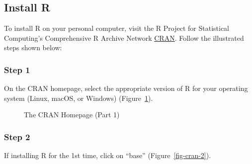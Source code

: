 \documentclass[
  letterpaper,
  DIV=11,
  numbers=noendperiod]{scrreprt}
\begin{document}
\subsection{Install R}\label{install-r}

To install R on your personal computer, visit the R Project for
Statistical Computing's Comprehensive R Archive Network
\href{https://cloud.r-project.org/}{CRAN}. Follow the illustrated steps
shown below:

\subsubsection{Step 1}\label{step-1}

On the CRAN homepage, select the appropriate version of R for your
operating system (Linux, macOS, or Windows) (Figure~\ref{fig-cran-1}).

\begin{figure}


\caption{\label{fig-cran-1}The CRAN Homepage (Part 1)}

\end{figure}%

\subsubsection{Step 2}\label{step-2}

If installing R for the 1st time, click on ``base''
(Figure~\ref{fig-cran-2}).
\end{document}
